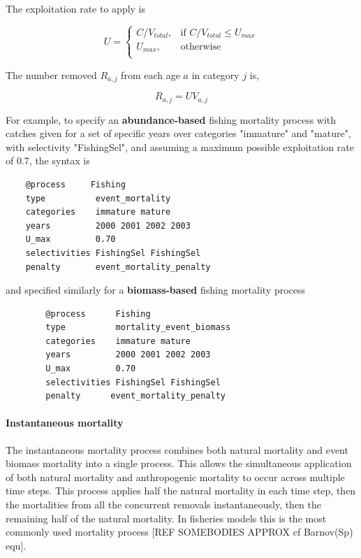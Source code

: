 The exploitation rate to apply is

\begin{equation}
U = \begin{cases}
  C/V_{total}, & \text{if $C/V_{total} \leq U_{max}$} \\
  U_{max}, & \text{otherwise}\\
  \end{cases}
\end{equation}

The number removed $R_{a,j}$ from each age $a$ in category $j$ is,

\begin{equation}
  R_{a,j} = U V_{a,j}
\end{equation}

For example, to specify an \textbf{abundance-based} fishing mortality process with catches given for a set of specific years over categories "immature" and "mature", with selectivity "FishingSel", and assuming a maximum possible exploitation rate of 0.7, the syntax is

{\small{\begin{verbatim}
	@process     Fishing
	type          event_mortality
	categories    immature mature
	years         2000 2001 2002 2003
	U_max         0.70
	selectivities FishingSel FishingSel
	penalty       event_mortality_penalty
	\end{verbatim}}}

and specified similarly for a \textbf{biomass-based} fishing mortality process

{\small{\begin{verbatim}
		@process      Fishing
		type          mortality_event_biomass
		categories    immature mature
		years         2000 2001 2002 2003
		U_max         0.70
		selectivities FishingSel FishingSel
		penalty      event_mortality_penalty
		\end{verbatim}}}

\paragraph{Instantaneous mortality}\label{subsubsec:instantaneous-mortality}

The instantaneous mortality process combines both natural mortality and event biomass mortality into a single process. This allows the simultaneous application of both natural mortality and anthropogenic mortality to occur across multiple time steps. This process applies half the natural mortality in each time step, then the mortalities from all the concurrent removals instantaneously, then the remaining half of the natural mortality. In fisheries models this is the most commonly used mortality process [REF SOMEBODIES APPROX cf Barnov(Sp) equ].

